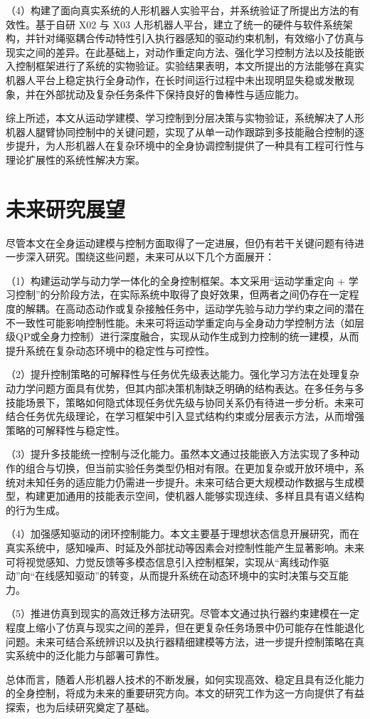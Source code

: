 （4）构建了面向真实系统的人形机器人实验平台，并系统验证了所提出方法的有效性。基于自研 X02 与 X03 人形机器人平台，建立了统一的硬件与软件系统架构，并针对绳驱耦合传动特性引入执行器感知的驱动约束机制，有效缩小了仿真与现实之间的差异。在此基础上，对动作重定向方法、强化学习控制方法以及技能嵌入控制框架进行了系统的实物验证。实验结果表明，本文所提出的方法能够在真实机器人平台上稳定执行全身动作，在长时间运行过程中未出现明显失稳或发散现象，并在外部扰动及复杂任务条件下保持良好的鲁棒性与适应能力。

综上所述，本文从运动学建模、学习控制到分层决策与实物验证，系统解决了人形机器人腿臂协同控制中的关键问题，实现了从单一动作跟踪到多技能融合控制的逐步提升，为人形机器人在复杂环境中的全身协调控制提供了一种具有工程可行性与理论扩展性的系统性解决方案。

\section{未来研究展望}

尽管本文在全身运动建模与控制方面取得了一定进展，但仍有若干关键问题有待进一步深入研究。围绕这些问题，未来可从以下几个方面展开：

（1）构建运动学与动力学一体化的全身控制框架。本文采用“运动学重定向 + 学习控制”的分阶段方法，在实际系统中取得了良好效果，但两者之间仍存在一定程度的解耦。在高动态动作或复杂接触任务中，运动学先验与动力学约束之间的潜在不一致性可能影响控制性能。未来可将运动学重定向与全身动力学控制方法（如层级QP或全身力控制）进行深度融合，实现从动作生成到力控制的统一建模，从而提升系统在复杂动态环境中的稳定性与可控性。

（2）提升控制策略的可解释性与任务优先级表达能力。强化学习方法在处理复杂动力学问题方面具有优势，但其内部决策机制缺乏明确的结构表达。在多任务与多技能场景下，策略如何隐式体现任务优先级与协同关系仍有待进一步分析。未来可结合任务优先级理论，在学习框架中引入显式结构约束或分层表示方法，从而增强策略的可解释性与稳定性。

（3）提升多技能统一控制与泛化能力。虽然本文通过技能嵌入方法实现了多种动作的组合与切换，但当前实验任务类型仍相对有限。在更加复杂或开放环境中，系统对未知任务的适应能力仍需进一步提升。未来可结合更大规模动作数据与生成模型，构建更加通用的技能表示空间，使机器人能够实现连续、多样且具有语义结构的行为生成。

（4）加强感知驱动的闭环控制能力。本文主要基于理想状态信息开展研究，而在真实系统中，感知噪声、时延及外部扰动等因素会对控制性能产生显著影响。未来可将视觉感知、力觉反馈等多模态信息引入控制框架，实现从“离线动作驱动”向“在线感知驱动”的转变，从而提升系统在动态环境中的实时决策与交互能力。

（5）推进仿真到现实的高效迁移方法研究。尽管本文通过执行器约束建模在一定程度上缩小了仿真与现实之间的差异，但在更复杂任务场景中仍可能存在性能退化问题。未来可结合系统辨识以及执行器精细建模等方法，进一步提升控制策略在真实系统中的泛化能力与部署可靠性。

总体而言，随着人形机器人技术的不断发展，如何实现高效、稳定且具有泛化能力的全身控制，将成为未来的重要研究方向。本文的研究工作为这一方向提供了有益探索，也为后续研究奠定了基础。